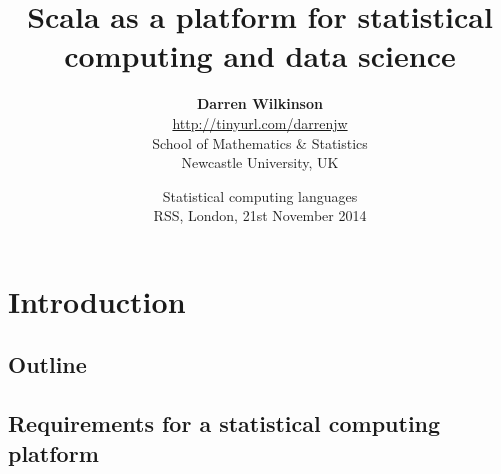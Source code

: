 \documentclass[mathserif,handout]{beamer}
\begin{document}
\title[Scala --- RSS language shoot-out]{Scala as a platform for statistical computing and data science}
\author[Darren Wilkinson --- RSS, London, 21/11/14]{\textbf{\large Darren Wilkinson} \\
\alert{\url{http://tinyurl.com/darrenjw}}\\
School of Mathematics \& Statistics\\Newcastle University, UK}
\date{Statistical computing languages\\RSS, London, 21st November 2014}

\frame{\titlepage}

\section{Introduction}

\subsection{Outline}


\subsection{Requirements for a statistical computing platform}
\end{document}
